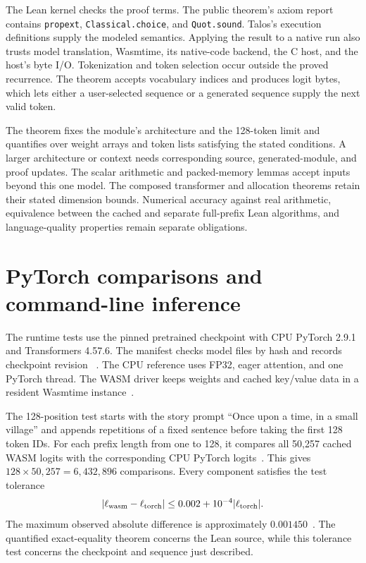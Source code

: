 \documentclass[11pt]{article}
\newcommand{\code}[1]{\texttt{#1}}
\newcommand{\longcode}[1]{\texttt{\seqsplit{#1}}}
\begin{document}
The Lean kernel checks the proof terms.  The public theorem's axiom report contains \code{propext}, \code{Classical.choice}, and \code{Quot.sound}.  Talos's execution definitions supply the modeled semantics.  Applying the result to a native run also trusts model translation, Wasmtime, its native-code backend, the C host, and the host's byte I/O.  Tokenization and token selection occur outside the proved recurrence.  The theorem accepts vocabulary indices and produces logit bytes, which lets either a user-selected sequence or a generated sequence supply the next valid token.

The theorem fixes the module's architecture and the 128-token limit and quantifies over weight arrays and token lists satisfying the stated conditions.  A larger architecture or context needs corresponding source, generated-module, and proof updates.  The scalar arithmetic and packed-memory lemmas accept inputs beyond this one model.  The composed transformer and allocation theorems retain their stated dimension bounds.  Numerical accuracy against real arithmetic, equivalence between the cached and separate full-prefix Lean algorithms, and language-quality properties remain separate obligations.

\section{PyTorch comparisons and command-line inference}\label{sec:tests}

The runtime tests use the pinned pretrained checkpoint with CPU PyTorch 2.9.1 and Transformers 4.57.6.  The manifest checks model files by hash and records checkpoint revision \longcode{607a30d783dfa663caf39e06633721c8d4cfcd7e}~\cite{manifest}.  The CPU reference uses FP32, eager attention, and one PyTorch thread.  The WASM driver keeps weights and cached key/value data in a resident Wasmtime instance~\cite{driver}.

The 128-position test starts with the story prompt ``Once upon a time, in a small village'' and appends repetitions of a fixed sentence before taking the first 128 token IDs.  For each prefix length from one to 128, it compares all 50,257 cached WASM logits with the corresponding CPU PyTorch logits~\cite{testcode}.  This gives $128\times50{,}257=6{,}432{,}896$ comparisons.  Every component satisfies the test tolerance
\[
|\ell_{\rm wasm}-\ell_{\rm torch}|
\leq 0.002+10^{-4}|\ell_{\rm torch}|.
\]
The maximum observed absolute difference is approximately $0.001450$~\cite{tests}.  The quantified exact-equality theorem concerns the Lean source, while this tolerance test concerns the checkpoint and sequence just described.
\end{document}
